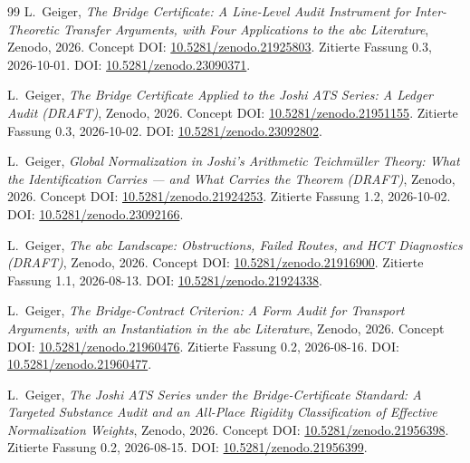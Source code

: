 \documentclass[11pt,a4paper]{article}
\theoremstyle{definition}
\theoremstyle{remark}
\begin{document}
\begin{thebibliography}{99}
L.~Geiger,
\emph{The Bridge Certificate: A Line-Level Audit Instrument for Inter-Theoretic Transfer Arguments, with Four Applications to the abc Literature},
Zenodo, 2026.
Concept DOI: \href{https://doi.org/10.5281/zenodo.21925803}{10.5281/zenodo.21925803}.
Zitierte Fassung 0.3, 2026-10-01.
DOI: \href{https://doi.org/10.5281/zenodo.23090371}{10.5281/zenodo.23090371}.

L.~Geiger,
\emph{The Bridge Certificate Applied to the Joshi ATS Series: A Ledger Audit (DRAFT)},
Zenodo, 2026.
Concept DOI: \href{https://doi.org/10.5281/zenodo.21951155}{10.5281/zenodo.21951155}.
Zitierte Fassung 0.3, 2026-10-02.
DOI: \href{https://doi.org/10.5281/zenodo.23092802}{10.5281/zenodo.23092802}.

L.~Geiger,
\emph{Global Normalization in Joshi's Arithmetic Teichmüller Theory: What the Identification Carries --- and What Carries the Theorem (DRAFT)},
Zenodo, 2026.
Concept DOI: \href{https://doi.org/10.5281/zenodo.21924253}{10.5281/zenodo.21924253}.
Zitierte Fassung 1.2, 2026-10-02.
DOI: \href{https://doi.org/10.5281/zenodo.23092166}{10.5281/zenodo.23092166}.

L.~Geiger,
\emph{The abc Landscape: Obstructions, Failed Routes, and HCT Diagnostics (DRAFT)},
Zenodo, 2026.
Concept DOI: \href{https://doi.org/10.5281/zenodo.21916900}{10.5281/zenodo.21916900}.
Zitierte Fassung 1.1, 2026-08-13.
DOI: \href{https://doi.org/10.5281/zenodo.21924338}{10.5281/zenodo.21924338}.

L.~Geiger,
\emph{The Bridge-Contract Criterion: A Form Audit for Transport Arguments, with an Instantiation in the abc Literature},
Zenodo, 2026.
Concept DOI: \href{https://doi.org/10.5281/zenodo.21960476}{10.5281/zenodo.21960476}.
Zitierte Fassung 0.2, 2026-08-16.
DOI: \href{https://doi.org/10.5281/zenodo.21960477}{10.5281/zenodo.21960477}.

L.~Geiger,
\emph{The Joshi ATS Series under the Bridge-Certificate Standard: A Targeted Substance Audit and an All-Place Rigidity Classification of Effective Normalization Weights},
Zenodo, 2026.
Concept DOI: \href{https://doi.org/10.5281/zenodo.21956398}{10.5281/zenodo.21956398}.
Zitierte Fassung 0.2, 2026-08-15.
DOI: \href{https://doi.org/10.5281/zenodo.21956399}{10.5281/zenodo.21956399}.

\end{thebibliography}
\end{document}
